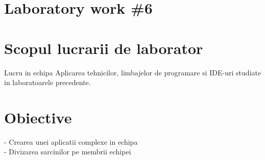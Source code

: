 \section*{Laboratory work \#6}

\section{Scopul lucrarii de laborator}
Lucru in echipa
Aplicarea tehnicilor, limbajelor de programare si IDE-uri studiate in laboratoarele precedente.
\section{Obiective}

- Crearea unei aplicatii complexe in echipa\\
\indent 
- Divizarea sarcinilor pe membrii echipei\\


\clearpage